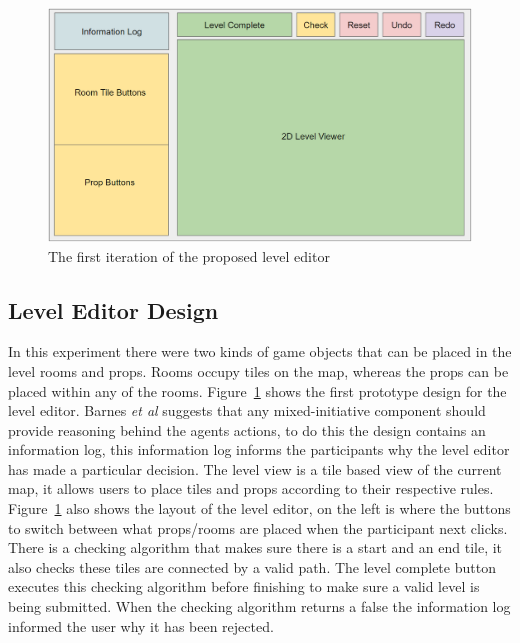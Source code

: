 \documentclass[journal]{IEEEtran}
\begin{document}
\begin{figure}[h]
	\includegraphics[width=1.0\linewidth]{LevelEditorLayout.PNG}
	\caption{The first iteration of the proposed level editor}
	\label{myLevelEditor}
\end{figure} 

\subsection{Level Editor Design}
In this experiment there were two kinds of game objects that can be placed in the level rooms and props. Rooms occupy tiles on the map, whereas the props can be placed within any of the rooms. Figure~\ref{myLevelEditor} shows the first prototype design for the level editor. Barnes \textit{et al}\cite{barnes2015designing} suggests that any mixed-initiative component should provide reasoning behind the agents actions, to do this the design contains an information log, this information log informs the participants why the level editor has made a particular decision. The level view is a tile based view of the current map, it allows users to place tiles and props according to their respective rules. Figure~\ref{myLevelEditor} also shows the layout of the level editor, on the left is where the buttons to switch between what props/rooms are placed when the participant next clicks. There is a checking algorithm that makes sure there is a start and an end tile, it also checks these tiles are connected by a valid path. The level complete button executes this checking algorithm before finishing to make sure a valid level is being submitted. When the checking algorithm returns a false the information log informed the user why it has been rejected.
\end{document}
